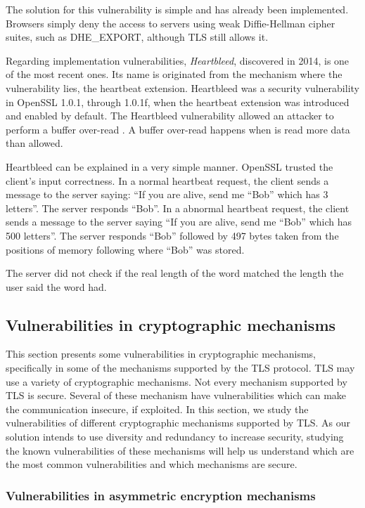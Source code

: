 \documentclass{sig-alternate-05-2015}
\begin{document}
The solution for this vulnerability is simple and has already been implemented. Browsers simply deny the access to servers using weak Diffie-Hellman cipher suites, such as DHE\_EXPORT, although TLS still allows it.

Regarding implementation vulnerabilities, \textit{Heartbleed}, discovered in 2014, is one of the most recent ones. Its name is originated from the mechanism where the vulnerability lies, the heartbeat extension. Heartbleed was a security vulnerability in OpenSSL 1.0.1, through 1.0.1f, when the heartbeat extension \cite{heartbeat-extension} was introduced and enabled by default. The Heartbleed vulnerability allowed an attacker to perform a buffer over-read \cite{Carvalho2014-HB}. A buffer over-read happens when is read more data than allowed. 

Heartbleed can be explained in a very simple manner. OpenSSL trusted the client's input correctness. In a normal heartbeat request, the client sends a message to the server saying: ``If you are alive, send me ``Bob'' which has 3 letters''. The server responds ``Bob''. In a abnormal heartbeat request, the client sends a message to the server saying ``If you are alive, send me ``Bob'' which has 500 letters''. The server responds ``Bob'' followed by 497 bytes taken from the positions of memory following where ``Bob'' was stored.

The server did not check if the real length of the word matched the length the user said the word had.

\subsection{Vulnerabilities in cryptographic mechanisms}

This section presents some vulnerabilities in cryptographic mechanisms, specifically in some of the mechanisms supported by the TLS protocol. TLS may use a variety of cryptographic mechanisms. Not every mechanism supported by TLS is secure. Several of these mechanism have vulnerabilities which can make the communication insecure, if exploited.
In this section, we study the vulnerabilities of different cryptographic mechanisms supported by TLS. As our solution intends to use diversity and redundancy to increase security, studying the known vulnerabilities of these mechanisms will help us understand which are the most common vulnerabilities and which mechanisms are secure.

\subsubsection{Vulnerabilities in asymmetric encryption mechanisms}
\end{document}
